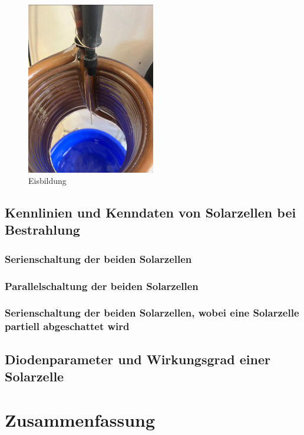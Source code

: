 \documentclass[12pt,english,ngerman]{scrartcl}
\begin{document}
\begin{figure}[H]
	\centering
	\includegraphics[width=0.5\textwidth]{figures/eis.PNG}
	\caption{Eisbildung}\label{fig:eis}
\end{figure}
\subsection{Kennlinien und Kenndaten von Solarzellen bei Bestrahlung}

\subsubsection{Serienschaltung der beiden Solarzellen}

\subsubsection{Parallelschaltung der beiden Solarzellen}

\subsubsection{Serienschaltung der beiden Solarzellen, wobei eine Solarzelle partiell abgeschattet wird}

\subsection{Diodenparameter und Wirkungsgrad einer Solarzelle}

\section{Zusammenfassung}\label{sec:zusammenfassung}
\end{document}
